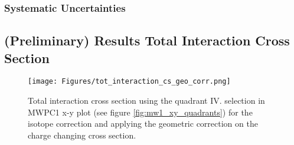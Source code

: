 \subsubsection{Systematic Uncertainties}


\subsection{(Preliminary) Results Total Interaction Cross Section}
\begin{figure}[h!]
    \centering
    \texttt{[image: Figures/tot\_interaction\_cs\_geo\_corr.png]}
    \caption{
	Total interaction cross section using the quadrant IV. selection in MWPC1 x-y plot (see figure \ref{fig:mw1_xy_quadrants}) for the isotope correction and applying the geometric correction on the charge changing cross section.}
    \label{fig:tot_interaction_cs}
\end{figure}
\newpage

